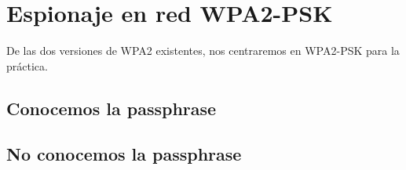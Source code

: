 \chapter{Espionaje en red WPA2-PSK}
De las dos versiones de WPA2 existentes, nos centraremos en WPA2-PSK para la práctica.
\section{Conocemos la passphrase}

\section{No conocemos la passphrase}